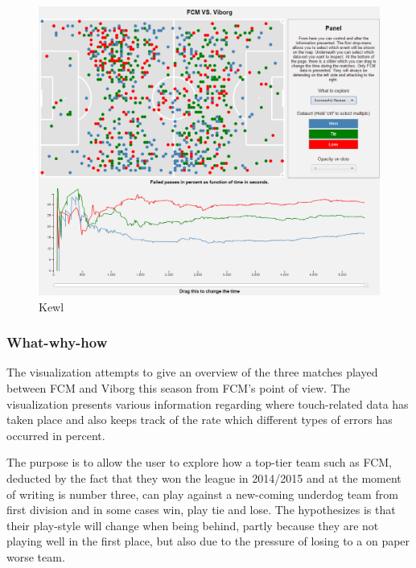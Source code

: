 \documentclass[Report.tex]{subfiles}
\begin{document}
 
\begin{figure}
	\center
	\includegraphics[width=\textwidth]{test.png}
	\caption{Kewl}
	\label{Fig:}
\end{figure}


\subsubsection*{What-why-how}
The visualization attempts to give an overview of the three matches played between FCM and Viborg this season from FCM's point of view. The visualization presents various information regarding where touch-related data has taken place and also keeps track of the rate which different types of errors has occurred in percent.

The purpose is to allow the user to explore how a top-tier team such as FCM, deducted by the fact that they won the league in 2014/2015 and at the moment of writing is number three, can play against a new-coming underdog team from first division and in some cases win, play tie and lose. The hypothesizes is that their play-style will change when being behind, partly because they are not playing well in the first place, but also due to the pressure of losing to a on paper worse team.
\end{document}
